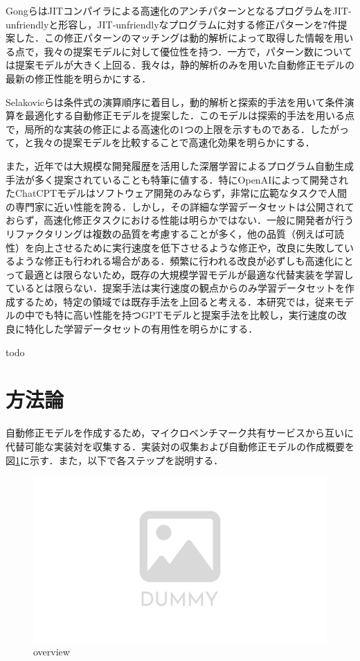 \documentclass[T,J]{fose} %
\begin{document}
Gongら\cite{Gong_2015}はJITコンパイラによる高速化のアンチパターンとなるプログラムをJIT-unfriendlyと形容し，JIT-unfriendlyなプログラムに対する修正パターンを7件提案した．この修正パターンのマッチングは動的解析によって取得した情報を用いる点で，我々の提案モデルに対して優位性を持つ．一方で，パターン数については提案モデルが大きく上回る．我々は，静的解析のみを用いた自動修正モデルの最新の修正性能を明らかにする．

Selakovicら\cite{Selakovic_2017}は条件式の演算順序に着目し，動的解析と探索的手法を用いて条件演算を最適化する自動修正モデルを提案した．このモデルは探索的手法を用いる点で，局所的な実装の修正による高速化の1つの上限を示すものである．したがって，\cite{Selakovic_2017}と我々の提案モデルを比較することで高速化効果を明らかにする．

また，近年では大規模な開発履歴を活用した深層学習によるプログラム自動生成手法が多く提案されていることも特筆に値する．特にOpenAIによって開発されたChatCPTモデルはソフトウェア開発のみならず，非常に広範なタスクで人間の専門家に近い性能を誇る．しかし，その詳細な学習データセットは公開されておらず，高速化修正タスクにおける性能は明らかではない．一般に開発者が行うリファクタリングは複数の品質を考慮することが多く，他の品質（例えば可読性）を向上させるために実行速度を低下させるような修正や，改良に失敗しているような修正も行われる場合がある．頻繁に行われる改良が必ずしも高速化にとって最適とは限らないため，既存の大規模学習モデルが最適な代替実装を学習しているとは限らない．提案手法は実行速度の観点からのみ学習データセットを作成するため，特定の領域では既存手法を上回ると考える．本研究では，従来モデルの中でも特に高い性能を持つGPTモデルと提案手法を比較し，実行速度の改良に特化した学習データセットの有用性を明らかにする．

todo


\section{方法論}

自動修正モデルを作成するため，マイクロベンチマーク共有サービスから互いに代替可能な実装対を収集する．実装対の収集および自動修正モデルの作成概要を図\ref{fig-overview}に示す．また，以下で各ステップを説明する．

\begin{figure}[t]
\centerline{\includegraphics[width=1.0\linewidth]{Omori_fig/dummy.pdf}}
\caption{overview}
\label{fig-overview}
\end{figure}
\end{document}
